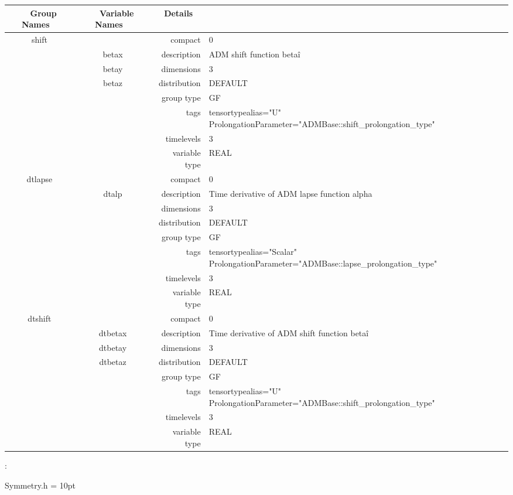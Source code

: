 \documentclass{article}
\begin{document}
\begin{tabular*}{150mm}{|c|c@{\extracolsep{\fill}}|rl|} \hline 
~ {\bf Group Names} ~ & ~ {\bf Variable Names} ~  &{\bf Details} ~ & ~ \\ 
\hline 
shift &  & compact & 0 \\ 
 & betax & description & ADM shift function beta\^i \\ 
 & betay & dimensions & 3 \\ 
 & betaz & distribution & DEFAULT \\ 
 &  & group type & GF \\ 
 &  & tags & tensortypealias="U" ProlongationParameter="ADMBase::shift\_prolongation\_type" \\ 
 &  & timelevels & 3 \\ 
 &  & variable type & REAL \\ 
\hline 
dtlapse &  & compact & 0 \\ 
 & dtalp & description & Time derivative of ADM lapse function alpha \\ 
 &  & dimensions & 3 \\ 
 &  & distribution & DEFAULT \\ 
 &  & group type & GF \\ 
 &  & tags & tensortypealias="Scalar" ProlongationParameter="ADMBase::lapse\_prolongation\_type" \\ 
 &  & timelevels & 3 \\ 
 &  & variable type & REAL \\ 
\hline 
dtshift &  & compact & 0 \\ 
 & dtbetax & description & Time derivative of ADM shift function beta\^i \\ 
 & dtbetay & dimensions & 3 \\ 
 & dtbetaz & distribution & DEFAULT \\ 
 &  & group type & GF \\ 
 &  & tags & tensortypealias="U" ProlongationParameter="ADMBase::shift\_prolongation\_type" \\ 
 &  & timelevels & 3 \\ 
 &  & variable type & REAL \\ 
\hline 
\end{tabular*} 



\vspace{5mm}

: 

Symmetry.h
\vspace{2mm}\parskip = 10pt 
\end{document}
